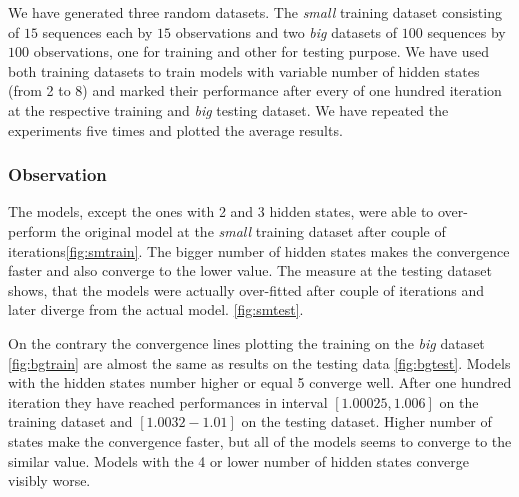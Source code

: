 \documentclass[thesis=M,english]{FITthesis}[2012/10/20]
\begin{document}
We have generated three random datasets. The \textit{small} training dataset consisting of $15$ sequences each by $15$ observations and two \textit{big} datasets of $100$ sequences by $100$ observations, one for training and other for testing purpose. We have used both training datasets to train models with variable number of hidden states (from 2 to 8) and marked their performance after every of one hundred iteration at the respective training and \textit{big} testing dataset. We have repeated the experiments five times and plotted the average results.   

\subsubsection*{ Observation }

The models, except the ones with 2 and 3 hidden states, were able to over-perform the original model at the \textit{small} training dataset after couple of iterations\ref{fig:smtrain}. The bigger number of hidden states makes the convergence faster and also converge to the lower value. The measure at the testing dataset shows, that the models were actually over-fitted after couple of iterations and later diverge from the actual model. \ref{fig:smtest}. 

On the contrary the convergence lines plotting the training on the \textit{big} dataset \ref{fig:bgtrain} are almost the same as results on the testing data \ref{fig:bgtest}. Models with the hidden states number higher or equal 5 converge well. After one hundred iteration they have reached performances in interval $[1.00025,1.006]$ on the training dataset and $[1.0032-1.01]$ on the testing dataset. Higher number of states make the convergence faster, but all of the models seems to converge to the similar value. Models with the 4 or lower number of hidden states converge visibly worse. 
\end{document}

